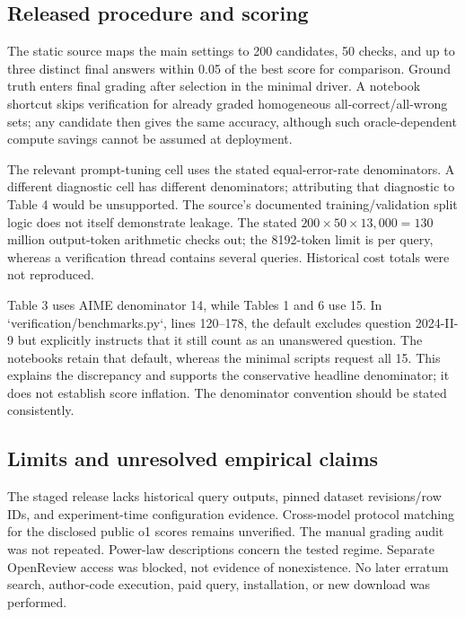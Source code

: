 \documentclass[10pt]{article}
\begin{document}
\subsection*{Released procedure and scoring}
The static source maps the main settings to 200 candidates, 50 checks, and up to three distinct final answers within 0.05 of the best score for comparison. Ground truth enters final grading after selection in the minimal driver. A notebook shortcut skips verification for already graded homogeneous all-correct/all-wrong sets; any candidate then gives the same accuracy, although such oracle-dependent compute savings cannot be assumed at deployment.\par
The relevant prompt-tuning cell uses the stated equal-error-rate denominators. A different diagnostic cell has different denominators; attributing that diagnostic to Table 4 would be unsupported. The source’s documented training/validation split logic does not itself demonstrate leakage. The stated \(200\times50\times13{,}000=130\) million output-token arithmetic checks out; the 8192-token limit is per query, whereas a verification thread contains several queries. Historical cost totals were not reproduced.\par
Table 3 uses AIME denominator 14, while Tables 1 and 6 use 15. In `verification/benchmarks.py`, lines 120–178, the default excludes question 2024-II-9 but explicitly instructs that it still count as an unanswered question. The notebooks retain that default, whereas the minimal scripts request all 15. This explains the discrepancy and supports the conservative headline denominator; it does not establish score inflation. The denominator convention should be stated consistently.\par
\subsection*{Limits and unresolved empirical claims}
The staged release lacks historical query outputs, pinned dataset revisions/row IDs, and experiment-time configuration evidence. Cross-model protocol matching for the disclosed public o1 scores remains unverified. The manual grading audit was not repeated. Power-law descriptions concern the tested regime. Separate OpenReview access was blocked, not evidence of nonexistence. No later erratum search, author-code execution, paid query, installation, or new download was performed.\par
\end{document}

